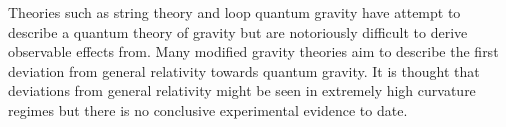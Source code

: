 Theories such as string theory and loop quantum gravity have attempt to describe a quantum theory of gravity but are notoriously difficult to derive observable effects from. Many modified gravity theories aim to describe the first deviation from general relativity towards quantum gravity. It is thought that deviations from general relativity might be seen in extremely high curvature regimes but there is no conclusive experimental evidence to date.





